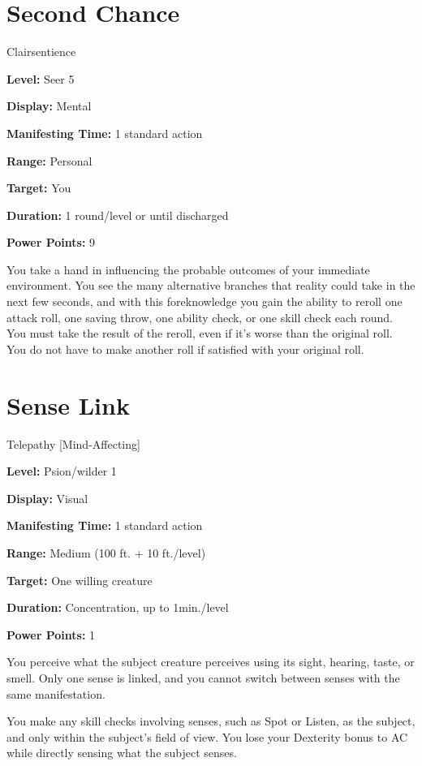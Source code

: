 \documentclass{article}
\begin{document}
\vspace{12pt}
\section*{Second Chance}

Clairsentience

\textbf{Level:} Seer 5

\textbf{Display:} Mental

\textbf{Manifesting Time:} 1 standard action

\textbf{Range:} Personal

\textbf{Target:} You

\textbf{Duration:} 1 round/level or until discharged

\textbf{Power Points:} 9

You take a hand in influencing the probable outcomes of your immediate environment. 
You see the many alternative branches that reality could take in the next few seconds, 
and with this foreknowledge you gain the ability to reroll one attack roll, one 
saving throw, one ability check, or one skill check each round. You must take the 
result of the reroll, even if it's worse than the original roll. You do not have 
to make another roll if satisfied with your original roll.

\vspace{12pt}
\section*{Sense Link}

Telepathy [Mind-Affecting]

\textbf{Level:} Psion/wilder 1

\textbf{Display:} Visual

\textbf{Manifesting Time:} 1 standard action

\textbf{Range:} Medium (100 ft. + 10 ft./level)

\textbf{Target:} One willing creature

\textbf{Duration:} Concentration, up to 1min./level

\textbf{Power Points:} 1

You perceive what the subject creature perceives using its sight, hearing, taste, 
or smell. Only one sense is linked, and you cannot switch between senses with the 
same manifestation.

You make any skill checks involving senses, such as Spot or Listen, as the subject, 
and only within the subject's field of view. You lose your Dexterity bonus to AC 
while directly sensing what the subject senses.
\end{document}
